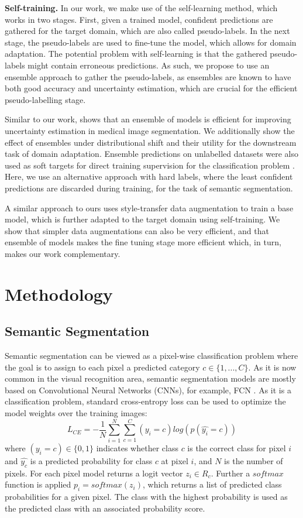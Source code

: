 \documentclass[conference]{IEEEtran}
\begin{document}
\textbf{Self-training.} In our work, we make use of the self-learning method, which works in two stages. First, given a trained model, confident predictions are gathered for the target domain, which are also called pseudo-labels. In the next stage, the pseudo-labels are used to fine-tune the model, which allows for domain adaptation. The potential problem with self-learning is that the gathered pseudo-labels might contain erroneous predictions. As such, we propose to use an ensemble approach to gather the pseudo-labels, as ensembles are known to have both good accuracy and uncertainty estimation, which are crucial for the efficient pseudo-labelling stage.

Similar to our work, \cite{medicalcaluncertainty} shows that an ensemble of models is efficient for improving uncertainty estimation in medical image segmentation. We additionally show the effect of ensembles under distributional shift and their utility for the downstream task of domain adaptation. Ensemble predictions on unlabelled datasets were also used as soft targets for direct training supervision for the classification problem \cite{modelcompression}. Here, we use an alternative approach with hard labels, where the least confident predictions are discarded during training, for the task of semantic segmentation. 
 
A similar approach to ours \cite{textureinvariant} uses style-transfer data augmentation to train a base model, which is further adapted to the target domain using self-training. We show that simpler data augmentations can also be very efficient, and that ensemble of models makes the fine tuning stage more efficient which, in turn, makes our work complementary. 

\section{Methodology}
\subsection{Semantic Segmentation}
Semantic segmentation can be viewed as a pixel-wise classification problem where the goal is to assign to each pixel a predicted category $c \in \{1, ..., C\}$. As it is now common in the visual recognition area, semantic segmentation models are mostly based on Convolutional Neural Networks (CNNs), for example, FCN \cite{FCN}. As it is a classification problem, standard cross-entropy loss can be used to optimize the model weights over the training images:
\begin{equation}
    L_{CE} = -\frac{1}{N} \sum_{i=1}^{N} \sum_{c=1}^{C} (y_i = c) log (p(\hat{y_i} = c))
\end{equation}
where $(y_i = c) \in \{0,1\}$ indicates whether class $c$ is the correct class for pixel $i$ and $\hat{y_c}$ is a predicted probability for class $c$ at pixel $i$, and $N$ is the number of pixels. For each pixel model returns a logit vector $ z_i \in R_c$. Further a $softmax$ function is applied $p_i = softmax(z_i)$, which returns a list of predicted class probabilities for a given pixel. The class with the highest probability is used as the predicted class with an associated probability score.
\end{document}
